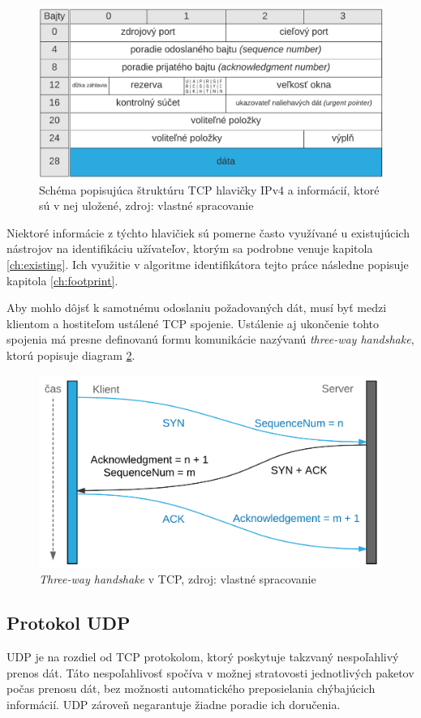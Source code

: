 \documentclass[
  digital, %
  table,   %
  lof,     %
  nolot,   %
  nocover
]{fithesis3}
\begin{document}
\begin{figure}[h]
  \centering
    \includegraphics[width=.95\textwidth]{images/net-tcp-head.png}
  \caption{Schéma popisujúca štruktúru TCP hlavičky IPv4 a informácií, ktoré sú v
  nej uložené, zdroj: vlastné spracovanie}
  \label{fig:net-tcp-head}
\end{figure}

Niektoré informácie z týchto hlavičiek sú pomerne často využívané u existujúcich
nástrojov na identifikáciu užívateľov, ktorým sa podrobne venuje kapitola
\ref{ch:existing}. Ich využitie v algoritme identifikátora tejto práce následne
popisuje kapitola \ref{ch:footprint}.

Aby mohlo dôjsť k samotnému odoslaniu požadovaných dát, musí byť medzi klientom
a hostiteľom ustálené TCP spojenie. Ustálenie aj ukončenie tohto spojenia má
presne definovanú formu komunikácie nazývanú \textit{three-way handshake}, ktorú
popisuje diagram \ref{fig:net-tcp-flow}.

\begin{figure}[h]
  \centering
    \includegraphics[width=.85\textwidth]{images/net-tcp-flow.png}
  \caption{\textit{Three-way handshake} v TCP, zdroj: vlastné spracovanie}
  \label{fig:net-tcp-flow}
\end{figure}

\subsection{Protokol UDP}
UDP je na rozdiel od TCP protokolom, ktorý poskytuje takzvaný nespoľahlivý
prenos dát. Táto nespoľahlivosť spočíva v možnej stratovosti jednotlivých
paketov počas prenosu dát, bez možnosti automatického preposielania chýbajúcich
informácií. UDP zároveň negarantuje žiadne poradie ich doručenia.
\end{document}
